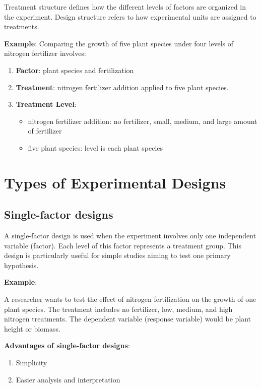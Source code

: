 \documentclass[
]{book}
\providecommand{\tightlist}{%
  \setlength{\itemsep}{0pt}\setlength{\parskip}{0pt}}
\begin{document}
Treatment structure defines how the different levels of factors are organized in the experiment. Design structure refers to how experimental units are assigned to treatments.

\textbf{Example}: Comparing the growth of five plant species under four levels of nitrogen fertilizer involves:

\begin{enumerate}
\def\labelenumi{\arabic{enumi}.}
\tightlist
\item
  \textbf{Factor}: plant species and fertilization
\item
  \textbf{Treatment}: nitrogen fertilizer addition applied to five plant species.
\item
  \textbf{Treatment Level}:

  \begin{itemize}
  \tightlist
  \item
    nitrogen fertilizer addition: no fertilizer, small, medium, and large amount of fertilizer
  \item
    five plant species: level is each plant species
  \end{itemize}
\end{enumerate}

\section{Types of Experimental Designs}\label{types-of-experimental-designs}

\subsection{Single-factor designs}\label{single-factor-designs}

A single-factor design is used when the experiment involves only one independent variable (factor). Each level of this factor represents a treatment group. This design is particularly useful for simple studies aiming to test one primary hypothesis.

\textbf{Example}:

A researcher wants to test the effect of nitrogen fertilization on the growth of one plant species. The treatment includes no fertilizer, low, medium, and high nitrogen treatments. The dependent variable (response variable) would be plant height or biomass.

\textbf{Advantages of single-factor designs}:

\begin{enumerate}
\def\labelenumi{\arabic{enumi}.}
\tightlist
\item
  Simplicity
\item
  Easier analysis and interpretation
\end{enumerate}
\end{document}
